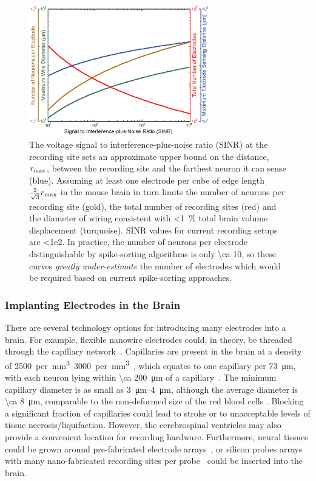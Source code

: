 \begin{figure}[htbp]
\caption{
The voltage signal to interference-plus-noise ratio (SINR) at the recording site sets an approximate upper bound on the distance, $r_{\text{\scriptsize max}}$, between the recording site and the farthest neuron it can sense (blue).
Assuming at least one electrode per cube of edge length $\frac{2}{\sqrt{3}}r_{\text{\scriptsize max}}$ in the mouse brain in turn limits the number of neurons per recording site (gold), the total number of recording sites (red) and the diameter of wiring consistent with \SI{<1}{\percent} total brain volume displacement (turquoise).
SINR values for current recording setups are \num{<1e2}.
In practice, the number of neurons per electrode distinguishable by spike-sorting algorithms is only \num{\ca 10}, so these curves \emph{greatly under-estimate} the number of electrodes which would be required based on current spike-sorting approaches.
}
\label{fig:snrlimits}
\centering
\includegraphics[width=0.7\textwidth]{figs/Fig3.eps}
\end{figure}

\subsubsection{Implanting Electrodes in the Brain}

There are several technology options for introducing many electrodes into a brain.
For example, flexible nanowire electrodes could, in theory, be threaded through the capillary network~\cite{llinas05}.
Capillaries are present in the brain at a density of \SIrange{2500}{3000}{per \milli\meter\cubed}~\cite{schmidt89}, which equates to one capillary per \SI{73}{\micro\meter}, with each neuron lying within \SI{\ca 200}{\micro\meter} of a capillary~\cite{loffredo08}. The minimum capillary diameter is as small as \SIrange{3}{4}{\micro\meter}, although the average diameter is \SI{\ca 8}{\micro\meter}, comparable to the non-deformed size of the red blood cells \cite{Freitas1999}. Blocking a significant fraction of capillaries could lead to stroke or to unacceptable levels of tissue necrosis/liquifaction.
However, the cerebrospinal ventricles may also provide a convenient location for recording hardware. Furthermore, neural tissues could be grown around pre-fabricated electrode arrays~\cite{jadhav12}, or silicon probes arrays with many nano-fabricated recording sites per probe~\cite{du11} could be inserted into the brain.

